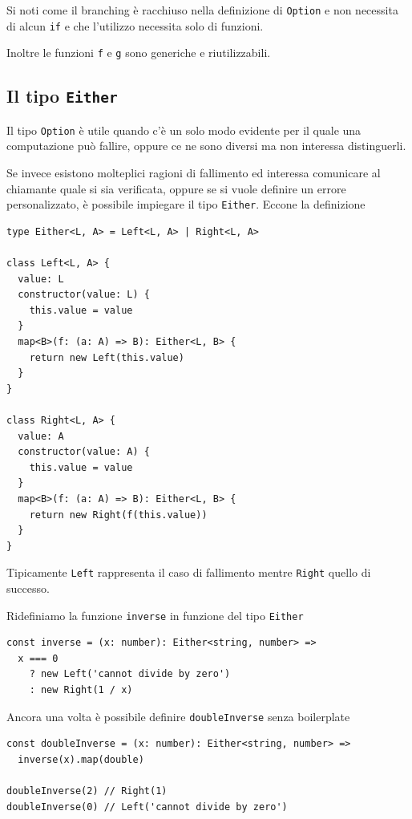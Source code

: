 \documentclass[12pt]{article}
\begin{document}
Si noti come il branching è racchiuso nella definizione di \texttt{Option} e non necessita di alcun \texttt{if}
e che l'utilizzo necessita solo di funzioni.

Inoltre le funzioni \texttt{f} e \texttt{g} sono generiche e riutilizzabili.

\subsection{Il tipo \texttt{Either}}

Il tipo \texttt{Option} è utile quando c'è un solo modo evidente per il quale una computazione può fallire,
oppure ce ne sono diversi ma non interessa distinguerli.

Se invece esistono molteplici ragioni di fallimento ed interessa comunicare al chiamante quale si sia verificata,
oppure se si vuole definire un errore personalizzato, è possibile impiegare il tipo \texttt{Either}. Eccone la definizione

\begin{verbatim}
type Either<L, A> = Left<L, A> | Right<L, A>

class Left<L, A> {
  value: L
  constructor(value: L) {
    this.value = value
  }
  map<B>(f: (a: A) => B): Either<L, B> {
    return new Left(this.value)
  }
}

class Right<L, A> {
  value: A
  constructor(value: A) {
    this.value = value
  }
  map<B>(f: (a: A) => B): Either<L, B> {
    return new Right(f(this.value))
  }
}
\end{verbatim}

Tipicamente \texttt{Left} rappresenta il caso di fallimento mentre \texttt{Right} quello di successo.

Ridefiniamo la funzione \texttt{inverse} in funzione del tipo \texttt{Either}

\begin{verbatim}
const inverse = (x: number): Either<string, number> =>
  x === 0
    ? new Left('cannot divide by zero')
    : new Right(1 / x)
\end{verbatim}

Ancora una volta è possibile definire \texttt{doubleInverse} senza boilerplate

\begin{verbatim}
const doubleInverse = (x: number): Either<string, number> =>
  inverse(x).map(double)

doubleInverse(2) // Right(1)
doubleInverse(0) // Left('cannot divide by zero')
\end{verbatim}
\end{document}
